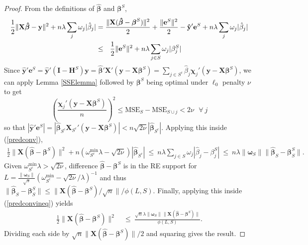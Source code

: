 \documentclass[12pt]{article}
\newcommand{\bs}[1]{\boldsymbol{#1}}
\newcommand{\mr}[1]{\mathrm{#1}}
\newcommand{\bm}[1]{\mathbf{#1}}
\begin{document}
\begin{proof}
From the definitions of $\bs{\hat\beta}$ and $\bs{\beta}^S$, 
\begin{align}\label{predconv}
\frac{1}{2}\|\bm{X}\bs{\hat \beta}-\bm{y}\|^2 +  n\lambda\sum_j\omega_j|\hat\beta_j|   &= \frac{\|\bm{X}(\bs{\hat\beta}-\bs{\beta}^S)\|^2}{2} + \frac{\|\bm{e}^S\|^2}{2} - \bm{\hat y}'\bm{e}^S+ n\lambda\sum_j\omega_j|\hat\beta_j| 
\\&\leq~~\frac{1}{2}\|\bm{e}^S\|^2 + n\lambda\sum_{j\in S}\omega_j|\beta^S_j|\notag
\end{align}
  Since $\bm{\hat y}'\bm{e}^S = \bm{\hat y}'(\bm{I}-\bm{H}^S)\bm{y} =
\bs{\hat\beta}'\bm{X}'(\bm{y}-\bm{X}\bs{\beta}^S) = 
\sum_{j\in S^c} \hat\beta_j\bs{\chi}_j'(\bm{y}-\bm{X}\bs{\beta}^S)
$,
 we can apply Lemma \ref{SSElemma} followed by $\bs{\beta}^S$ being optimal under $\ell_0$ penalty $\nu$ to get 
\begin{equation} \label{L0ineq}
\left(\frac{\bs{\chi}_j'(\bm{y}-\bm{X}\bs{\beta}^S)}{n}\right)^2
\leq \mr{MSE}_S - \mr{MSE}_{S\cup j} < 2\nu ~~~\forall~j
\end{equation}
so that $|\bm{\hat y}'\bm{e}^S| = |\bs{\hat\beta}_{S^c}\bm{X}_{S^c}'(\bm{y}-\bm{X}\bs{\beta}^S)| < n\sqrt{2\nu}|\bs{\hat\beta}_{S^c}|$.  Applying this inside (\ref{predconv}),
\begin{align}\label{predconvineq}
\frac{1}{2}\|\bm{X}(\bs{\hat\beta}-\bs{\beta}^S)\|^2
  + n\left(\omega^{\mr{min}}_{S^c}\lambda-\sqrt{2\nu}\right)|\bs{\hat\beta}_{S^c}|
  ~\leq~ n\lambda\sum_{j\in S}\omega_j|\hat\beta_{j}-\beta^S_j|
  ~\leq~ n\lambda\|\bs{\omega}_S\|\|\bs{\hat\beta}_{S}-\bs{\beta}^S_S\|.
\end{align}
Given $\omega^{\mr{min}}_{S^c}\lambda > \sqrt{2\nu}$,
difference $\bs{\hat\beta}-\bs{\beta}^S$ is in the RE support for 
$L=\frac{\|\bs{\omega}_S\|}{\sqrt{s}}(\omega^{\mr{min}}_{S^c}-\sqrt{2\nu}/\lambda)^{-1}$ and thus $\|\bs{\hat\beta}_{S}-\bs{\beta}^S_S\| \leq \|\bm{X}(\bs{\hat\beta}-\bs{\beta}^S)/\sqrt{n}\|/\phi(L,S)$.  Finally, applying this inside (\ref{predconvineq}) yields
\begin{align}
\frac{1}{2}\|\bm{X}(\bs{\hat\beta}-\bs{\beta}^S)\|^2
  &~\leq~ \frac{\sqrt{n}\lambda\|\bs{\omega}_S\|\|\bm{X}(\bs{\hat\beta}-\bs{\beta}^S)\|}
  {\phi(L, S)}.
\end{align}
Dividing each side by $\sqrt{n}\|\bm{X}(\bs{\hat\beta}-\bs{\beta}^S)\|/2$ and squaring gives the result.
\end{proof}

\end{document}
